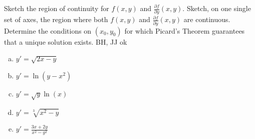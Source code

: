 \documentclass[12pt]{book}
\begin{document}
\begin{exercise}
{\color{red}
Sketch the region of continuity for $f(x,y)$ and $\frac{\partial f}{\partial y}(x,y)$.
}
{\color{blue}
Sketch, on one single set of axes, the region where both $f(x,y)$ and $\frac{\partial f}{\partial y}(x,y)$
are continuous.
}
Determine the conditions on $(x_0,y_0)$ for which Picard's Theorem guarantees that a unique solution exists. 
{\color{teal}BH, JJ ok}

\begin{enumerate}[a)]
    \item $y' = \sqrt{2x-y}$
    \item $y' = \ln(y-x^2)$
    \item $y' = \sqrt{y} \ln(x)$
    \item $y' = \sqrt[3]{x^2-y}$
    \item $y' = \frac{3x+2y}{x^2 - y^2}$
\end{enumerate}


\end{exercise}
\vspace{5mm}
\end{document}

